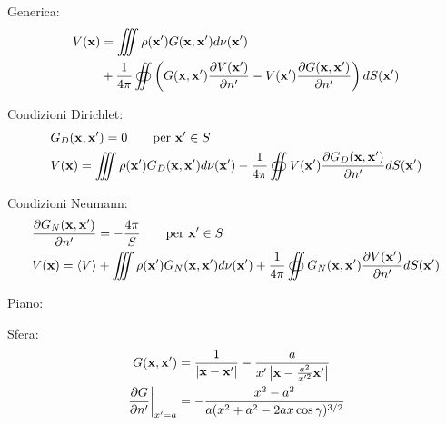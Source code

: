 Generica:
\begin{align*}
	V({\bf x}) &= \iiint \rho({\bf x'})G({\bf x},{\bf x'}) d\nu({\bf x'})\\%
			   &+ \frac{1}{4\pi} \oiint \left(%
		G({\bf x},{\bf x'})\frac{\p V({\bf x'})}{\p n'} - V({\bf x'}) \frac{\p G({\bf x},{\bf x'})}{\p n'}%
	\right) dS({\bf x'})
\end{align*}

Condizioni Dirichlet:
\begin{align*}
	&G_D({\bf x},{\bf x'}) = 0 \qquad \text{per } {\bf x'} \in S \\
	&V({\bf x}) = \iiint \rho({\bf x'})G_D({\bf x},{\bf x'}) d\nu({\bf x'})%
		- \frac{1}{4\pi} \oiint V({\bf x'}) \frac{\p G_D({\bf x},{\bf x'})}{\p n'} dS({\bf x'})
\end{align*}

Condizioni Neumann:
\begin{align*}
	&\frac{\p G_N({\bf x},{\bf x'})}{\p n'} = - \frac{4\pi}{S} \qquad \text{per } {\bf x'} \in S \\
	&V({\bf x}) = \langle V \rangle + \iiint \rho({\bf x'})G_N({\bf x},{\bf x'}) d\nu({\bf x'})%
		+ \frac{1}{4\pi} \oiint G_N({\bf x},{\bf x'})\frac{\p V({\bf x'})}{\p n'} dS({\bf x'})
\end{align*}

Piano:

Sfera:
\begin{align*}
	G({\bf x}, {\bf x'}) &= \frac{1}{\left|{\bf x} - {\bf x'}\right|} - \frac{a}{x'\left|{{\bf x} - \frac{a^2}{x'^2}{\bf x'}}\right|} \\
	\left. \frac{\partial G}{\partial n'} \right|_{x'=a} &= - \frac{x^2 - a^2}{a(x^2 + a^2 - 2ax\cos \gamma)^{3/2}}
\end{align*}
